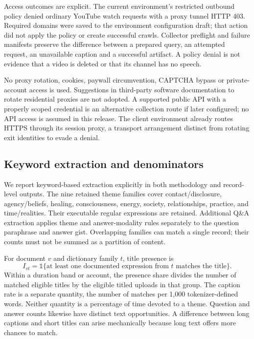 Access outcomes are explicit. The current environment's restricted outbound policy denied ordinary YouTube watch requests with a proxy tunnel HTTP 403. Required domains were saved to the environment configuration draft; that action did not apply the policy or create successful crawls. Collector preflight and failure manifests preserve the difference between a prepared query, an attempted request, an unavailable caption and a successful artifact. A policy denial is not evidence that a video is deleted or that its channel has no speech.

No proxy rotation, cookies, paywall circumvention, CAPTCHA bypass or private-account access is used. Suggestions in third-party software documentation to rotate residential proxies are not adopted. A supported public API with a properly scoped credential is an alternative collection route if later configured; no API access is assumed in this release. The client environment already routes HTTPS through its session proxy, a transport arrangement distinct from rotating exit identities to evade a denial.

\subsection{Keyword extraction and denominators}
We report keyword-based extraction explicitly in both methodology and record-level outputs. The nine retained theme families cover contact/disclosure, agency/beliefs, healing, consciousness, energy, society, relationships, practice, and time/realities. Their executable regular expressions are retained. Additional Q\&A extraction applies theme and answer-modality rules separately to the question paraphrase and answer gist. Overlapping families can match a single record; their counts must not be summed as a partition of content.

For document $v$ and dictionary family $t$, title presence is
\begin{equation}
 I_{vt}=\mathbb{1}\{\text{at least one documented expression from }t\text{ matches the title}\}.
\end{equation}
Within a duration band or account, the presence share divides the number of matched eligible titles by the eligible titled uploads in that group. The caption rate is a separate quantity, the number of matches per 1,000 tokenizer-defined words. Neither quantity is a percentage of time devoted to a theme. Question and answer counts likewise have distinct text opportunities. A difference between long captions and short titles can arise mechanically because long text offers more chances to match.

